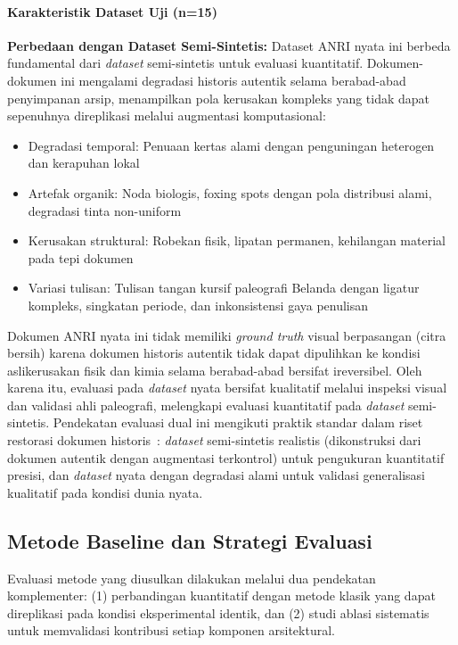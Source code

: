 \documentclass[journal]{IEEEtran}
\begin{document}
\paragraph{Karakteristik Dataset Uji (n=15)}
\textbf{Perbedaan dengan Dataset Semi-Sintetis:} Dataset ANRI nyata ini berbeda fundamental dari \textit{dataset} semi-sintetis untuk evaluasi kuantitatif. Dokumen-dokumen ini mengalami degradasi historis autentik selama berabad-abad penyimpanan arsip, menampilkan pola kerusakan kompleks yang tidak dapat sepenuhnya direplikasi melalui augmentasi komputasional:
\begin{itemize}
    \item Degradasi temporal: Penuaan kertas alami dengan penguningan heterogen dan kerapuhan lokal
    \item Artefak organik: Noda biologis, foxing spots dengan pola distribusi alami, degradasi tinta non-uniform
    \item Kerusakan struktural: Robekan fisik, lipatan permanen, kehilangan material pada tepi dokumen
    \item Variasi tulisan: Tulisan tangan kursif paleografi Belanda dengan ligatur kompleks, singkatan periode, dan inkonsistensi gaya penulisan
\end{itemize}

Dokumen ANRI nyata ini tidak memiliki \textit{ground truth} visual berpasangan (citra bersih) karena dokumen historis autentik tidak dapat dipulihkan ke kondisi asli\textemdash kerusakan fisik dan kimia selama berabad-abad bersifat ireversibel. Oleh karena itu, evaluasi pada \textit{dataset} nyata bersifat kualitatif melalui inspeksi visual dan validasi ahli paleografi, melengkapi evaluasi kuantitatif pada \textit{dataset} semi-sintetis. Pendekatan evaluasi dual ini mengikuti praktik standar dalam riset restorasi dokumen historis~\cite{souibgui2021enhance,souibgui2020degan}: \textit{dataset} semi-sintetis realistis (dikonstruksi dari dokumen autentik dengan augmentasi terkontrol) untuk pengukuran kuantitatif presisi, dan \textit{dataset} nyata dengan degradasi alami untuk validasi generalisasi kualitatif pada kondisi dunia nyata.

\subsection{Metode Baseline dan Strategi Evaluasi}

Evaluasi metode yang diusulkan dilakukan melalui dua pendekatan komplementer: (1) perbandingan kuantitatif dengan metode klasik yang dapat direplikasi pada kondisi eksperimental identik, dan (2) studi ablasi sistematis untuk memvalidasi kontribusi setiap komponen arsitektural.
\end{document}
